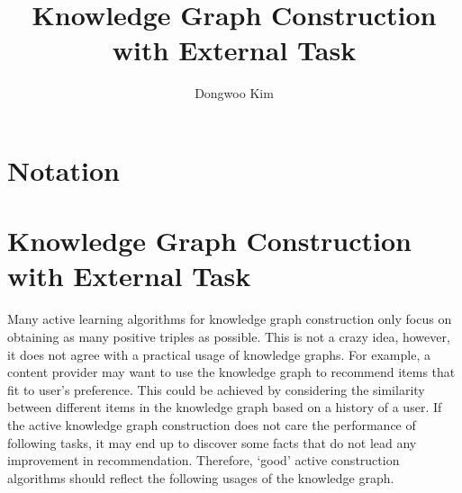 \documentclass{article} %
\title{Knowledge Graph Construction with External Task}
\author{
Dongwoo Kim
}
\theoremstyle{definition}
\begin{document}
\maketitle

\section{Notation}

\section{Knowledge Graph Construction with External Task}

Many active learning algorithms for knowledge graph construction only focus on obtaining as many positive triples as possible. This is not a crazy idea, however, it does not agree with a practical usage of knowledge graphs. For example, a content provider may want to use the knowledge graph to recommend items that fit to user's preference. This could be achieved by considering the similarity between different items in the knowledge graph based on a history of a user. If the active knowledge graph construction does not care the performance of following tasks, it may end up to discover some facts that do not lead any improvement in recommendation. Therefore, `good' active construction algorithms should reflect the following usages of the knowledge graph.
\end{document}
